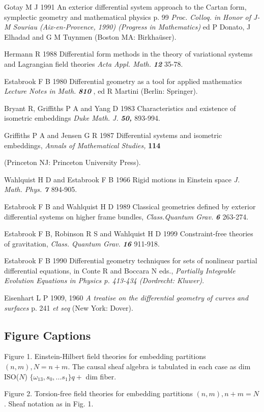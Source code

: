 \documentclass[a4paper,a4paper]{article}
\begin{document}
\begin{thebibliography}{10}

Gotay M J 1991 An exterior differential system approach to the Cartan
form,  symplectic geometry and mathematical physics p. 99 {\itshape
Proc. Colloq. in Honor of J-M Souriau (Aix-en-Provence,  1990) (Progress in
Mathematics) }ed P Donato,  J Elhadad and G M Tuynmen (Boston MA:
Birkha\"{u}ser).

Hermann R 1988 Differential form methods in the theory of variational
systems and Lagrangian field theories {\itshape Acta Appl. Math.
}{\bfseries {\itshape 12}} 35-78.

Estabrook F B 1980 Differential geometry as a tool for applied
mathematics {\itshape Lecture Notes in Math. }{\bfseries {\itshape 810}}
,  ed R Martini (Berlin:  Springer).

Bryant R,  Griffiths P A and Yang D 1983 Characteristics and existence
of isometric embeddings {\itshape Duke Math. J. }{\bfseries {\itshape
50,  }}893-994.

Griffiths P A and Jensen G R 1987 Differential systems and isometric
embeddings,  {\itshape Annals of Mathematical Studies,  }{\bfseries 114}

(Princeton NJ:  Princeton University Press).

Wahlquist H D and Estabrook F B 1966  Rigid motions in Einstein space
{\itshape J. Math. Phys. }{\bfseries {\itshape 7  }}894-905.

Estabrook F B and Wahlquist H D 1989 Classical geometries defined by
exterior differential systems on higher frame bundles,  {\itshape
Class.Quantum Grav. }{\bfseries {\itshape 6 }}263-274.

Estabrook F B,  Robinson R S and Wahlquist H D 1999  Constraint-free
theories of gravitation,  {\itshape Class. Quantum Grav. }{\bfseries
{\itshape 16 }}911-918.

Estabrook F B 1990 Differential geometry techniques for sets of
nonlinear partial differential equations,  in Conte R and Boccara N
eds., {\itshape Partially Integrable Evolution Equations in Physics p. 413-434
(Dordrecht: Kluwer)}.

Eisenhart L P 1909,  1960  {\itshape A treatise on the differential
geometry of curves and surfaces }p. 241 {\itshape et seq }(New York:
Dover).
\end{thebibliography}

\subsection*{Figure Captions}

Figure 1.  Einstein-Hilbert field theories for embedding partitions $(n,
m),  N = n + m$.  The causal sheaf algebra is tabulated in each case
as dim ISO($N$) $\{{\omega }_{13},  {s_0},  ... {s_1}\} q +$ dim
fiber.

Figure 2.  Torsion-free field theories for embedding partitions $(n,
m),   n + m = N$.  Sheaf notation as in Fig. 1.
\end{document}
